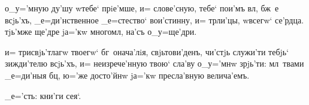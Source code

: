 о_у='мную ду'шу w\т тебе` прiе'мше, и= слове'сную, тебе` 
пои'мъ вл, бж~е всjь'хъ, _е=ди'нственное _е=стество` 
вои'стинну, и= тр ли'цы, w\т всегw` се'рдца. 
тjь'мже ще'дре jа='кw многомл, на'съ о_у=ще'дри.

и= трисвjь'тлагw твоегw` бг~онача'лiя, свjьтови'денъ, 
чи'стjь служи'ти тебjь` зижди'телю всjь'хъ, и= 
неизрече'нную твою` сла'ву о_у='мнw зрjь'ти: мл~твами 
_е=ди'ныя бц, ю='же досто'йнw jа='кw пресла'вную 
велича'емъ.

_е='сть: %
кни'ги сея`.%
